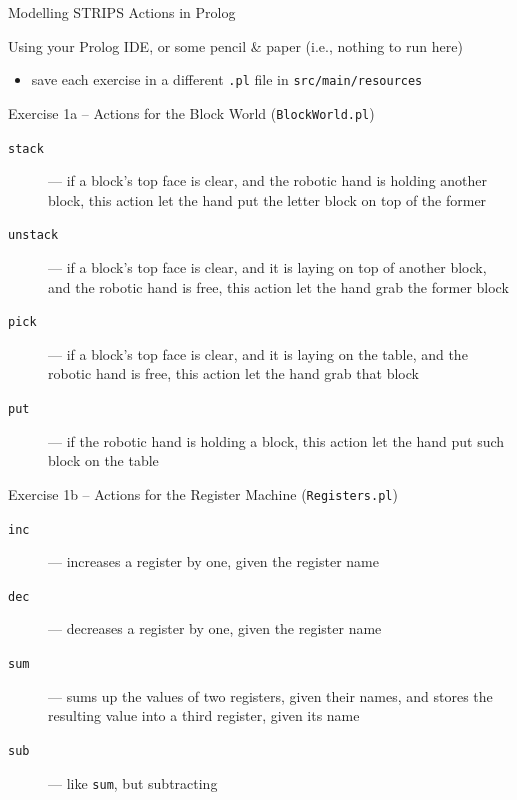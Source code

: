 \documentclass[presentation]{beamer}\mode<presentation>{\usetheme{AMSBolognaFC}}
\begin{document}
\begin{frame}[allowframebreaks]{Modelling STRIPS Actions in Prolog}

Using your Prolog IDE, or some pencil \& paper (i.e., nothing to run here)
%
\begin{itemize}
    \item save each exercise in a different \texttt{.pl} file in \texttt{src/main/\alert{resources}}
\end{itemize}

\begin{block}{Exercise 1a -- Actions for the Block World (\texttt{BlockWorld.pl})}
   	\begin{description}
   	    \item[\texttt{stack}] --- if a block's top face is clear, and the robotic hand is holding another block, this action let the hand put the letter block on top of the former

   	    \item[\texttt{unstack}] --- if a block's top face is clear, and it is laying on top of another block, and the robotic hand is free, this action let the hand grab the former block

   	    \item[\texttt{pick}] --- if a block's top face is clear, and it is laying on the table, and the robotic hand is free, this action let the hand grab that block

   	    \item[\texttt{put}] --- if the robotic hand is holding a block, this action let the hand put such block on the table
   	\end{description}
\end{block}

\begin{block}{Exercise 1b -- Actions for the Register Machine (\texttt{Registers.pl})}
   	\begin{description}
   	    \item[\texttt{inc}] --- increases a register by one, given the register name
   	    \item[\texttt{dec}] --- decreases a register by one, given the register name
   	    \item[\texttt{sum}] --- sums up the values of two registers, given their names, and stores the resulting value into a third register, given its name
   	    \item[\texttt{sub}] --- like \texttt{sum}, but subtracting
   	\end{description}
\end{block}


\end{frame}
\end{document}
